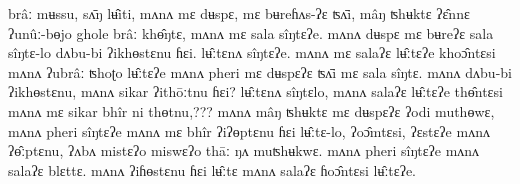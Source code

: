\documentclass[twoside,a4paper,11pt]{article}
\newcommand{\ipa}[1]{{\phon#1}}
\begin{document}
\ipa{brâː}  	\ipa{mʉssu,}  	\ipa{sʌ̄ŋ}  	\ipa{lʉ̂iti,}  
\ipa{mʌnʌ}  	\ipa{mɛ}  	\ipa{dʉspɛ,}  	\ipa{mɛ}  	\ipa{bʉreɦʌs-ʔɛ}  	\ipa{ʦʌ̄i,}  
\ipa{mâŋ}  	\ipa{ʦhʉktɛ}  	\ipa{ʔɛ̂nnɛ}  	\ipa{ʔunûː-bɵjo}  	\ipa{ghole}  	\ipa{brâː}  	\ipa{khɵ̂ŋtɛ,}  
\ipa{mʌnʌ}  	\ipa{mɛ}  	\ipa{sala}  	\ipa{sîŋtɛʔe.}  
\ipa{mʌnʌ}  	\ipa{dʉspɛ}  	\ipa{mɛ}  	\ipa{bʉreʔɛ}  	\ipa{sala}  	\ipa{sîŋtɛ-lo}  
\ipa{dʌbu-bi}  	\ipa{ʔikhɵstɛnu}  	\ipa{ɦɛi.}   \ipa{lʉ̂ːtɛnʌ}  	\ipa{sîŋtɛʔe.}  
\ipa{mʌnʌ}  	\ipa{mɛ}  	\ipa{salaʔɛ}  	\ipa{lʉ̂ːtɛʔe}  	\ipa{khoɔ̂ntɛsi}  
\ipa{mʌnʌ}  	\ipa{ʔubrâː}  	\ipa{ʦhoʈo}  	\ipa{lʉ̂ːtɛʔe}  	\ipa{mʌnʌ}  	\ipa{pheri}  	\ipa{mɛ}  	\ipa{dʉspɛʔɛ}  	\ipa{ʦʌ̄i}  	\ipa{mɛ}  	\ipa{sala}  	\ipa{sîŋtɛ.}  
\ipa{mʌnʌ}  	\ipa{dʌbu-bi}  	\ipa{ʔikhɵstɛnu,}  	\ipa{mʌnʌ}  	\ipa{sikar}  	\ipa{ʔithōːtnu}  	\ipa{ɦɛi?}  
\ipa{lʉ̂ːtɛnʌ}  	\ipa{sîŋtɛlo,}  
\ipa{mʌnʌ}  	\ipa{salaʔɛ}  	\ipa{lʉ̂ːtɛʔe}  	\ipa{thɵ̂ntɛsi}  
\ipa{mʌnʌ}  	\ipa{mɛ}  	\ipa{sikar}  	\ipa{bhîr}  	\ipa{ni}  	\ipa{thɵtnu,}??? 	 
\ipa{mʌnʌ}  	\ipa{mâŋ}  	\ipa{ʦhʉktɛ}  	\ipa{mɛ}  	\ipa{dʉspɛʔɛ}  	\ipa{ʔodi}  	\ipa{muthɵwɛ,}  
\ipa{mʌnʌ}  	\ipa{pheri}  	\ipa{sîŋtɛʔe}  	\ipa{mʌnʌ}  	\ipa{mɛ}  	\ipa{bhîr}  	\ipa{ʔiʔɵptɛnu}  	\ipa{ɦɛi}  	\ipa{lʉ̂ːtɛ-lo,}  
\ipa{ʔoɔ̂mtɛsi,}  	\ipa{ʔɛstɛʔe}  
\ipa{mʌnʌ}  	\ipa{ʔɵ̂ːptɛnu,}  	\ipa{ʔʌbʌ}  	\ipa{mistɛʔo}  	\ipa{miswɛʔo}  	\ipa{thāː}  	\ipa{ŋʌ}  	\ipa{muʦhʉkwɛ.}  
\ipa{mʌnʌ}  	\ipa{pheri}  	\ipa{sîŋtɛʔe}  	\ipa{mʌnʌ}  	\ipa{salaʔɛ}  	\ipa{blɛttɛ.}  
\ipa{mʌnʌ}  	\ipa{ʔiɦɵstɛnu}  	\ipa{ɦɛi}  	\ipa{lʉ̂ːtɛ}  	
\ipa{mʌnʌ}  	\ipa{salaʔɛ}  	\ipa{ɦoɔ̂ntɛsi}  	\ipa{lʉ̂ːtɛʔe.}  






\end{document}
